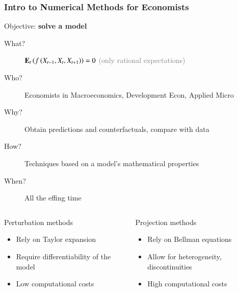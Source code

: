 \documentclass[10pt, aspectratio=1610, handout]{beamer}
\begin{document}
  \begin{frame}
    \frametitle{Intro to Numerical Methods for Economists}

    Objective: \textbf{solve a model}

    \vfill\pause

    \begin{description}
      \item[What?] $\mathbf{E}_t \left( f \left( X_{t-1}, X_t, X_{t+1} \right) \right) = 0$ \hspace{2em} \textcolor{gray}{(only rational expectations)}
      \pause
      \item[Who?] Economists in Macroeconomics, Development Econ, Applied Micro
      \pause
      \item[Why?] Obtain predictions and counterfactuals, compare with data
      \pause
      \item[How?] Techniques based on a model's mathematical properties
      \pause
      \item[When?] All the effing time
    \end{description}

    \vfill\pause

    \begin{columns}
      \begin{column}{0.475\textwidth}
        \begin{block}{Perturbation methods}
          \begin{itemize}
            \item Rely on Taylor expansion
            \item Require differentiability of the model
            \item Low computational costs
          \end{itemize}
        \end{block}
      \end{column}
      \begin{column}{0.475\textwidth}
        \begin{block}{Projection methods}
          \begin{itemize}
            \item Rely on Bellman equations
            \item Allow for heterogeneity, discontinuities
            \item High computational costs
          \end{itemize}
        \end{block}
      \end{column}
    \end{columns}

  \end{frame}
\end{document}
